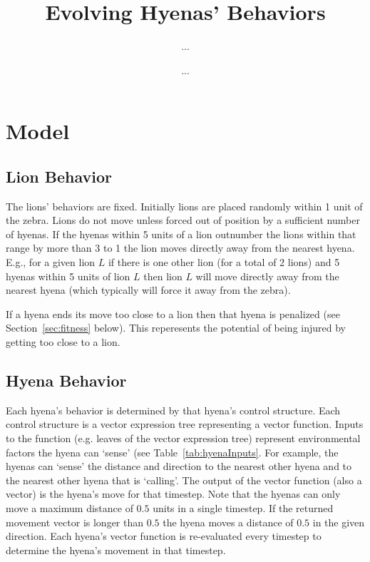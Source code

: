 \documentclass{article}
\title{Evolving Hyenas' Behaviors}
\author{...}
\date{...}
\begin{document}
\maketitle

\section{Model}

\subsection{Lion Behavior}

The lions' behaviors are fixed.  Initially lions are placed randomly within 1 unit of the zebra.  Lions do not move unless forced out of position by a sufficient number of hyenas.  If the hyenas within 5 units of a lion outnumber the lions within that range by more than 3 to 1 the lion moves directly away from the nearest hyena.  E.g., for a given lion $L$ if there is one other lion (for a total of 2 lions) and 5 hyenas within 5 units of lion $L$ then lion $L$ will move directly away from the nearest hyena (which typically will force it away from the zebra).

If a hyena ends its move too close to a lion then that hyena is penalized (see Section~\ref{sec:fitness} below).   This reperesents the potential of being injured by getting too close to a lion.

\subsection{Hyena Behavior}

Each hyena's behavior is determined by that hyena's control structure.  Each control structure is a vector expression tree representing a vector function.  Inputs to the function (e.g. leaves of the vector expression tree) represent environmental factors the hyena can `sense' (see Table~\ref{tab:hyenaInputs}.  For example, the hyenas can `sense' the distance and direction to the nearest other hyena and to the nearest other hyena that is `calling'.  The output of the vector function (also a vector) is the hyena's move for that timestep.  Note that the hyenas can only move a maximum distance of $0.5$ units in a single timestep.  If the returned movement vector is longer than $0.5$ the hyena moves a distance of $0.5$ in the given direction.  
Each hyena's vector function is re-evaluated every timestep to determine the hyena's movement in that timestep.
\end{document}
